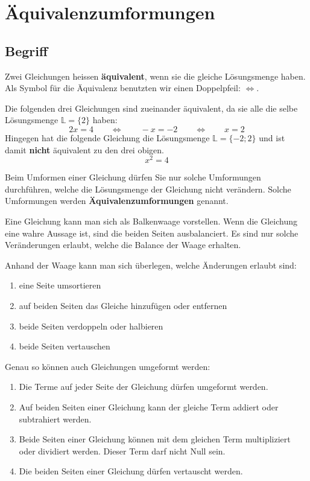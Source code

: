 \newpage
\section{Äquivalenzumformungen}

\subsection{Begriff}
Zwei Gleichungen heissen \textbf{äquivalent}, wenn sie die gleiche Lösungsmenge haben. Als Symbol für die Äquivalenz benutzten wir einen Doppelpfeil: $\Leftrightarrow$.

\begin{example}
  Die folgenden drei Gleichungen sind zueinander äquivalent, da sie alle die selbe Lösungsmenge $\mathbb{L} = \{2\}$ haben:
  \[
    2x = 4 \qquad\Leftrightarrow\qquad -x = -2 \qquad\Leftrightarrow\qquad x = 2
  \]
  Hingegen hat die folgende Gleichung die Lösungsmenge $ \mathbb{L} = \{ -2; 2 \}$ und ist damit \textbf{nicht} äquivalent zu den drei obigen.
  \[
  x^{2} = 4
  \]
\end{example}

Beim Umformen einer Gleichung dürfen Sie nur solche Umformungen durchführen, welche die Lösungsmenge der Gleichung nicht verändern.
Solche Umformungen werden \textbf{Äquivalenzumformungen} genannt.

Eine Gleichung kann man sich als Balkenwaage vorstellen. Wenn die Gleichung eine wahre Aussage ist, sind die beiden Seiten ausbalanciert. Es sind nur solche Veränderungen erlaubt, welche die Balance der Waage erhalten.
\begin{center}
\end{center}
Anhand der Waage kann man sich überlegen, welche Änderungen erlaubt sind:

\begin{enumerate}
  \item eine Seite umsortieren
  \item auf beiden Seiten das Gleiche hinzufügen oder entfernen
  \item beide Seiten verdoppeln oder halbieren
  \item beide Seiten vertauschen
\end{enumerate}

Genau so können auch Gleichungen umgeformt werden:

\begin{enumerate}
  \item Die Terme auf jeder Seite der Gleichung dürfen umgeformt werden.
  \item Auf beiden Seiten einer Gleichung kann der gleiche Term addiert oder subtrahiert werden.
  \item Beide Seiten einer Gleichung können mit dem gleichen Term multipliziert oder dividiert werden. Dieser Term darf nicht Null sein.
  \item Die beiden Seiten einer Gleichung dürfen vertauscht werden.
\end{enumerate}

